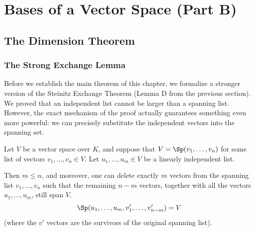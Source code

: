 \renewcommand{\thetheorem}{11.b.\arabic{theorem}}
\setcounter{theorem}{0}
\setcounter{chapter}{10}

\chapter{Bases of a Vector Space (Part B)}

\setcounter{section}{1}
\section{The Dimension Theorem}

\subsection{The Strong Exchange Lemma}

Before we establish the main theorem of this chapter, we formalize a stronger version of the Steinitz Exchange Theorem (Lemma D from the previous section). We proved that an independent list cannot be larger than a spanning list. However, the exact mechanism of the proof actually guarantees something even more powerful: we can precisely substitute the independent vectors into the spanning set.

\begin{lemma}
\label{lem:strong_steinitz}
Let $V$ be a vector space over $K$, and suppose that $V = \Sp(v_1, \dots, v_n)$ for some list of vectors $v_1, \dots, v_n \in V$. Let $u_1, \dots, u_m \in V$ be a linearly independent list. 

Then $m \le n$, and moreover, one can delete exactly $m$ vectors from the spanning list $v_1, \dots, v_n$ such that the remaining $n-m$ vectors, together with all the vectors $u_1, \dots, u_m$, still span $V$.
\[
\Sp(u_1, \dots, u_m, v'_1, \dots, v'_{n-m}) = V
\]
(where the $v'$ vectors are the survivors of the original spanning list).
\end{lemma}

